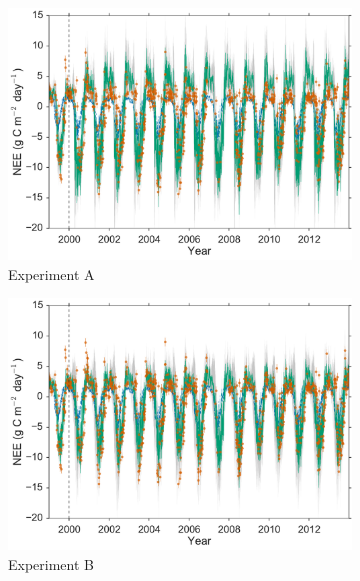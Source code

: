 \begin{figure}
    \centering
    \begin{subfigure}[b]{0.49\textwidth}
        \includegraphics[width=\textwidth]{chapter/chapter6/A4dvar2.pdf}
        \caption{Experiment A}
        \label{chap6:fig:4dvardiagBR}
    \end{subfigure}
    \begin{subfigure}[b]{0.49\textwidth}
        \includegraphics[width=\textwidth]{chapter/chapter6/B4dvar2.pdf}
        \caption{Experiment B}
        \label{chap6:fig:4dvaredcBR}
    \end{subfigure}
    \begin{subfigure}[b]{0.49\textwidth}

\end{subfigure}
\end{figure}
